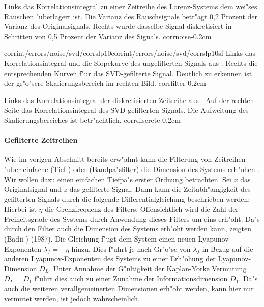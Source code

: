 {Links das Korrelationsintegral zu einer Zeitreihe des Lorenz-Systems dem wei"ses
Rauschen "uberlagert ist. Die Varianz des Rauschsignals betr"agt 0,2 Prozent der Varianz des
Originalsignals. Rechts wurde dasselbe Signal diskretisiert in Schritten von 0,5 Prozent
der Varianz des Signals.
}{corrnoise}{-0.2cm}

{corrint/errors/noise/svd/corrslp10}{corrint/errors/noise/svd/corrslp10sf}
{Links das Korrelationsintegral und die Slopekurve des ungefilterten Signals aus
. Rechts die entsprechenden Kurven f"ur das SVD-gefilterte
Signal. Deutlich zu erkennen ist der gr"o"sere Skalierungsbereich im rechten Bild.
}{corrfilter}{-0.2cm}

{Links das Korrelationsintegral der diskretisierten Zeitreihe aus . Auf
  der rechten Seite das Korrelationsintegral des SVD-gefilterten Signals. Die Aufweitung des
  Skalierungsbereiches ist betr"achtlich.
}{corrdiscrete}{-0.2cm}

\paragraph{Gefilterte Zeitreihen}
\label{chapcorrdimfiltered}
Wie im vorigen Abschnitt bereits erw"ahnt kann die Filterung von Zeitreihen "uber einfache 
\begriff(Tief-) oder \begriff(Bandpa"sfilter) die Dimension des Systems erh"ohen \cite{Badii-politi}. Wir wollen dazu einen
einfachen Tiefpa"s erster Ordnung betrachten. Sei $x$ das Originalsignal und $z$ das
gefilterte Signal. Dann kann die Zeitabh"angigkeit des gefilterten Signals durch die
folgende Differentialgleichung beschrieben werden:
Hierbei ist $\eta$ die Grenzfrequenz des Filters. Offensichtlich wird die Zahl der
Freiheitsgrade des Systems durch Anwendung dieses Filters um eins erh"oht. Da"s durch den
Filter auch die Dimension des Systems erh"oht werden kann, zeigten \autor(Badii \etal)
(1987). Die Gleichung f"ugt dem System einen neuen Lyapunov-Exponenten
$\lambda_f=-\eta$ hinzu. Dies f"uhrt je nach Gr"o"se von $\lambda_f$ in Bezug auf die
anderen Lyapunov-Exponenten des Systems zu einer Erh"ohung der Lyapunov-Dimension
$D_L$. Unter Annahme der G"ultigkeit der  Kaplan-Yorke Vermutung $D_L=D_1$ f"uhrt dies
auch zu einer Zunahme der Informationsdimension $D_1$. Da"s auch die weiteren
verallgemeinerten Dimensionen erh"oht werden, kann hier nur vermutet werden, ist jedoch
wahrscheinlich.

